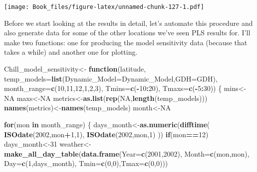 \documentclass[
]{book}
\newenvironment{Shaded}{\begin{snugshade}}{\end{snugshade}}
\newcommand{\ControlFlowTok}[1]{\textcolor[rgb]{0.13,0.29,0.53}{\textbf{#1}}}
\newcommand{\DataTypeTok}[1]{\textcolor[rgb]{0.13,0.29,0.53}{#1}}
\newcommand{\DecValTok}[1]{\textcolor[rgb]{0.00,0.00,0.81}{#1}}
\newcommand{\KeywordTok}[1]{\textcolor[rgb]{0.13,0.29,0.53}{\textbf{#1}}}
\newcommand{\NormalTok}[1]{#1}
\newcommand{\OperatorTok}[1]{\textcolor[rgb]{0.81,0.36,0.00}{\textbf{#1}}}
\newcommand{\OtherTok}[1]{\textcolor[rgb]{0.56,0.35,0.01}{#1}}
\newcommand{\StringTok}[1]{\textcolor[rgb]{0.31,0.60,0.02}{#1}}
\begin{document}
\texttt{[image: Book\_files/figure-latex/unnamed-chunk-127-1.pdf]}

Before we start looking at the results in detail, let's automate this procedure and also generate data for some of the other locations we've seen PLS results for. I'll make two functions: one for producing the model sensitivity data (because that takes a while) and another one for plotting.

\begin{Shaded}
\begin{Highlighting}[]
\NormalTok{Chill_model_sensitivity<-}
\StringTok{  }\ControlFlowTok{function}\NormalTok{(latitude,}
           \DataTypeTok{temp_models=}\KeywordTok{list}\NormalTok{(}\DataTypeTok{Dynamic_Model=}\NormalTok{Dynamic_Model,}\DataTypeTok{GDH=}\NormalTok{GDH),}
           \DataTypeTok{month_range=}\KeywordTok{c}\NormalTok{(}\DecValTok{10}\NormalTok{,}\DecValTok{11}\NormalTok{,}\DecValTok{12}\NormalTok{,}\DecValTok{1}\NormalTok{,}\DecValTok{2}\NormalTok{,}\DecValTok{3}\NormalTok{),}
           \DataTypeTok{Tmins=}\KeywordTok{c}\NormalTok{(}\OperatorTok{-}\DecValTok{10}\OperatorTok{:}\DecValTok{20}\NormalTok{),}
           \DataTypeTok{Tmaxs=}\KeywordTok{c}\NormalTok{(}\OperatorTok{-}\DecValTok{5}\OperatorTok{:}\DecValTok{30}\NormalTok{))}
\NormalTok{  \{}
\NormalTok{  mins<-}\OtherTok{NA}
\NormalTok{  maxs<-}\OtherTok{NA}
\NormalTok{  metrics<-}\KeywordTok{as.list}\NormalTok{(}\KeywordTok{rep}\NormalTok{(}\OtherTok{NA}\NormalTok{,}\KeywordTok{length}\NormalTok{(temp_models)))}
  \KeywordTok{names}\NormalTok{(metrics)<-}\KeywordTok{names}\NormalTok{(temp_models)}
\NormalTok{  month<-}\OtherTok{NA}
 
  \ControlFlowTok{for}\NormalTok{(mon }\ControlFlowTok{in}\NormalTok{ month_range)}
\NormalTok{    \{}
\NormalTok{    days_month<-}\KeywordTok{as.numeric}\NormalTok{(}\KeywordTok{difftime}\NormalTok{( }\KeywordTok{ISOdate}\NormalTok{(}\DecValTok{2002}\NormalTok{,mon}\OperatorTok{+}\DecValTok{1}\NormalTok{,}\DecValTok{1}\NormalTok{),}
                                      \KeywordTok{ISOdate}\NormalTok{(}\DecValTok{2002}\NormalTok{,mon,}\DecValTok{1}\NormalTok{) ))}
    \ControlFlowTok{if}\NormalTok{(mon}\OperatorTok{==}\DecValTok{12}\NormalTok{) days_month<-}\DecValTok{31}
\NormalTok{    weather<-}\KeywordTok{make_all_day_table}\NormalTok{(}\KeywordTok{data.frame}\NormalTok{(}\DataTypeTok{Year=}\KeywordTok{c}\NormalTok{(}\DecValTok{2001}\NormalTok{,}\DecValTok{2002}\NormalTok{),}
                                           \DataTypeTok{Month=}\KeywordTok{c}\NormalTok{(mon,mon),}
                                           \DataTypeTok{Day=}\KeywordTok{c}\NormalTok{(}\DecValTok{1}\NormalTok{,days_month),}
                                           \DataTypeTok{Tmin=}\KeywordTok{c}\NormalTok{(}\DecValTok{0}\NormalTok{,}\DecValTok{0}\NormalTok{),}\DataTypeTok{Tmax=}\KeywordTok{c}\NormalTok{(}\DecValTok{0}\NormalTok{,}\DecValTok{0}\NormalTok{)))}


\end{Highlighting}
\end{Shaded}
\end{document}
